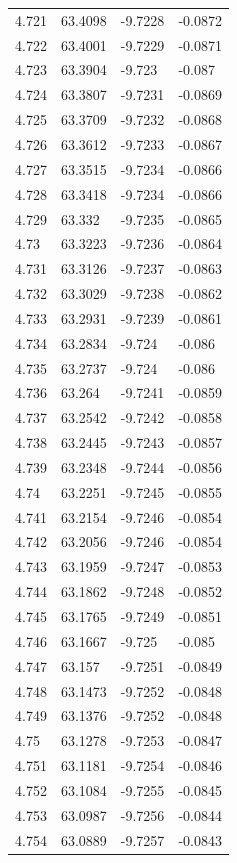 \begin{tabular}{llll}
4.721 & 63.4098 & -9.7228 & -0.0872 \\
4.722 & 63.4001 & -9.7229 & -0.0871 \\
4.723 & 63.3904 & -9.723 & -0.087 \\
4.724 & 63.3807 & -9.7231 & -0.0869 \\
4.725 & 63.3709 & -9.7232 & -0.0868 \\
4.726 & 63.3612 & -9.7233 & -0.0867 \\
4.727 & 63.3515 & -9.7234 & -0.0866 \\
4.728 & 63.3418 & -9.7234 & -0.0866 \\
4.729 & 63.332 & -9.7235 & -0.0865 \\
4.73 & 63.3223 & -9.7236 & -0.0864 \\
4.731 & 63.3126 & -9.7237 & -0.0863 \\
4.732 & 63.3029 & -9.7238 & -0.0862 \\
4.733 & 63.2931 & -9.7239 & -0.0861 \\
4.734 & 63.2834 & -9.724 & -0.086 \\
4.735 & 63.2737 & -9.724 & -0.086 \\
4.736 & 63.264 & -9.7241 & -0.0859 \\
4.737 & 63.2542 & -9.7242 & -0.0858 \\
4.738 & 63.2445 & -9.7243 & -0.0857 \\
4.739 & 63.2348 & -9.7244 & -0.0856 \\
4.74 & 63.2251 & -9.7245 & -0.0855 \\
4.741 & 63.2154 & -9.7246 & -0.0854 \\
4.742 & 63.2056 & -9.7246 & -0.0854 \\
4.743 & 63.1959 & -9.7247 & -0.0853 \\
4.744 & 63.1862 & -9.7248 & -0.0852 \\
4.745 & 63.1765 & -9.7249 & -0.0851 \\
4.746 & 63.1667 & -9.725 & -0.085 \\
4.747 & 63.157 & -9.7251 & -0.0849 \\
4.748 & 63.1473 & -9.7252 & -0.0848 \\
4.749 & 63.1376 & -9.7252 & -0.0848 \\
4.75 & 63.1278 & -9.7253 & -0.0847 \\
4.751 & 63.1181 & -9.7254 & -0.0846 \\
4.752 & 63.1084 & -9.7255 & -0.0845 \\
4.753 & 63.0987 & -9.7256 & -0.0844 \\
4.754 & 63.0889 & -9.7257 & -0.0843 \\

\end{tabular}

